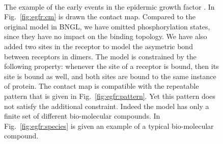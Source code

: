 \documentclass{entcs}
\begin{document}
\begin{figure}[t]
{\begin{minipage}{0.59\linewidth}
\begin{center}\smallskip\\\end{center}%
\end{minipage}}
\caption{The example of the early events in the epidermic growth factor \cite{Blinov-2006-ANM}. In Fig.~\ref{fig:egfr:cm} is drawn the contact map. Compared to the original model in BNGL, we have omitted phosphorylation states, since they have no impact on the binding topology. We have also
added two sites in the receptor to model the asymetric bond between receptors  in dimers.
The model is constrained by the following property: whenever the site  of a receptor  is bound, then its site  is bound as well, and both sites are bound to the same instance
of protein. The contact map is compatible with the repeatable pattern that is given in Fig.~\ref{fig:egfr:pattern}. Yet this pattern does not satisfy the additional constraint. Indeed the model has only a finite set of different bio-molecular compounds. In Fig.~\ref{fig:egfr:species} is given an example of a typical bio-molecular compound.}
\label{fig:egfr}
 \end{figure}
\end{document}
